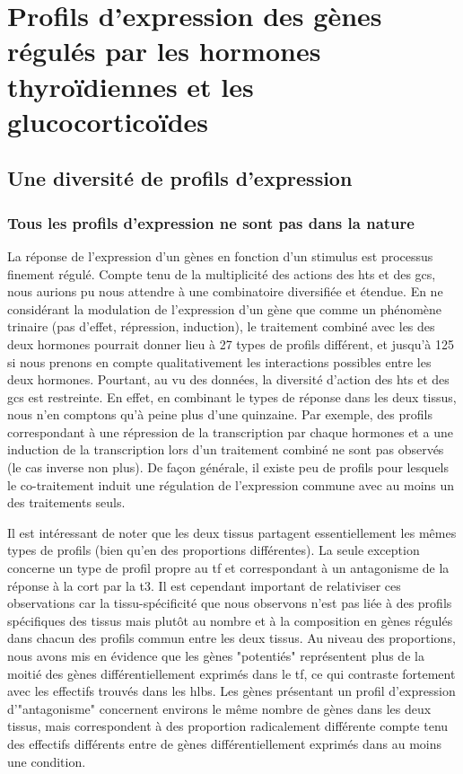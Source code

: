 \documentclass[../main.tex]{subfiles}
\begin{document}
\chapter{Profils d'expression des gènes régulés par les hormones thyroïdiennes et les glucocorticoïdes}


\section{Une diversité de profils d'expression}

\subsection{Tous les profils d'expression ne sont pas dans la nature}
La réponse de l'expression d'un gènes en fonction d'un stimulus est processus finement régulé.
Compte tenu de la multiplicité des actions des \glspl{ht} et des \glspl{gc}, nous aurions pu nous attendre à une combinatoire diversifiée et étendue.
En ne considérant la modulation de l'expression d'un gène que comme un phénomène trinaire (pas d'effet, répression, induction), le traitement combiné avec les des deux hormones pourrait donner lieu à 27 types de profils différent, et jusqu'à 125 si nous prenons en compte qualitativement les interactions possibles entre les deux hormones.
Pourtant, au vu des données, la diversité d'action des \glspl{ht} et des \glspl{gc} est restreinte.
En effet, en combinant le types de réponse dans les deux tissus, nous n'en comptons qu'à peine plus d'une quinzaine.
Par exemple, des profils correspondant à une répression de la transcription par chaque hormones et a une induction de la transcription lors d'un traitement combiné ne sont pas observés (le cas inverse non plus).
De façon générale, il existe peu de profils pour lesquels le co-traitement induit une régulation de l'expression commune avec au moins un des traitements seuls.
\par
Il est intéressant de noter que les deux tissus partagent essentiellement les mêmes types de profils (bien qu'en des proportions différentes).
La seule exception concerne un type de profil propre au \gls{tf} et correspondant à un antagonisme de la réponse à la \gls{cort} par la \gls{t3}.
Il est cependant important de relativiser ces observations car la tissu-spécificité que nous observons n'est pas liée à des profils spécifiques des tissus mais plutôt au nombre et à la composition en gènes régulés dans chacun des profils commun entre les deux tissus.
Au niveau des proportions, nous avons mis en évidence que les gènes "potentiés" représentent plus de la moitié des gènes différentiellement exprimés dans le \gls{tf}, ce qui contraste fortement avec les effectifs trouvés dans les \glspl{hlb}.
Les gènes présentant un profil d'expression d'"antagonisme" concernent environs le même nombre de gènes dans les deux tissus, mais correspondent à des proportion radicalement différente compte tenu des effectifs différents entre de gènes différentiellement exprimés dans au moins une condition.
\end{document}

